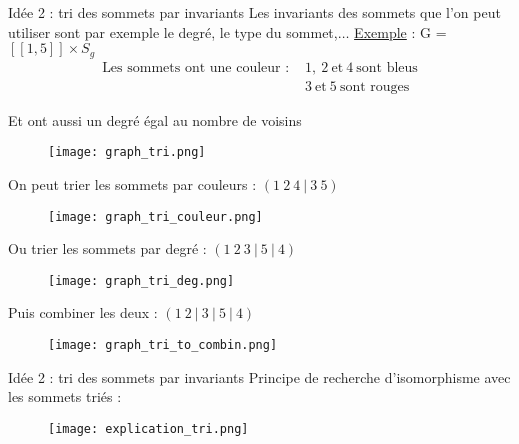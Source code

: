 \begin{frame}{Idée 2 : tri des sommets par invariants}
Les invariants des sommets que l'on peut utiliser sont par exemple le degré, le type du sommet,$\dots$ \newline\newline
\underline{Exemple} : G = $[\![1,5]\!] \times S_g$
\begin{align*}
\text{Les sommets ont une couleur : }
    & 1 ,\ 2\ \text{et}\ 4\ \text{sont bleus} \\
    & 3\ \text{et}\ 5\ \text{sont rouges}
\end{align*}
\begin{center}
Et ont aussi un degré égal au nombre de voisins
\end{center}
\begin{figure}[!htb]
    \texttt{[image: graph\_tri.png]}
\end{figure}


\end{frame}
\footnotesize
\begin{frame}
    \begin{center}
        On peut trier les sommets par couleurs : $(1\ 2\ 4\ |\ 3\ 5)$
        \begin{figure}[!htb]
        \texttt{[image: graph\_tri\_couleur.png]}
        \end{figure}
        Ou trier les sommets par degré : $(1\ 2\ 3\ |\ 5\ |\ 4)$
        \begin{figure}[!htb]
        \texttt{[image: graph\_tri\_deg.png]}
        \end{figure}
        Puis combiner les deux :  $(1\ 2\ |\ 3\ |\ 5\ |\ 4)$
        \begin{figure}[!htb]
        \texttt{[image: graph\_tri\_to\_combin.png]}
        \end{figure}
    \end{center}
\end{frame}

\begin{frame}{Idée 2 : tri des sommets par invariants}
Principe de recherche d'isomorphisme avec les sommets triés :
\begin{figure}[!htb]
    \texttt{[image: explication\_tri.png]}
    \end{figure}
\end{frame}

